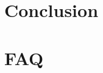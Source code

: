 \documentclass[11pt]{article}
\begin{document}



% 

% 

\section{Conclusion}

\clearpage

\section{FAQ}
\end{document}
